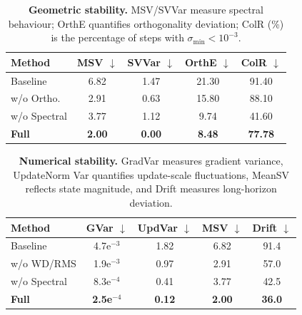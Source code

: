 \begin{table}[!t]
    \centering
    \setlength{\tabcolsep}{4.5pt}
    \caption{\textbf{Geometric stability.}
        MSV/SVVar measure spectral behaviour; OrthE quantifies orthogonality deviation;
        ColR (\%) is the percentage of steps with $\sigma_{\min}<10^{-3}$.}
    \label{tab:geo_stability}
    \begin{tabular}{
            l
            S[table-format=1.2]
            S[table-format=1.2]
            S[table-format=2.2]
            S[table-format=2.2]
        }
        \toprule
        Method & {MSV $\downarrow$} & {SVVar $\downarrow$} & {OrthE $\downarrow$} & {ColR $\downarrow$} \\
        \midrule
        Baseline      & 6.82 & 1.47 & 21.30 & 91.40 \\
        w/o Ortho.    & 2.91 & 0.63 & 15.80 & 88.10 \\
        w/o Spectral  & 3.77 & 1.12 &  9.74 & 41.60 \\
        \midrule
        \textbf{Full} & {\textbf{2.00}} & {\textbf{0.00}} & {\textbf{8.48}} & {\textbf{77.78}} \\
        \bottomrule
    \end{tabular}
\end{table}

\begin{table}[!t]
    \centering
    \setlength{\tabcolsep}{4.5pt}
    \caption{\textbf{Numerical stability.}
        GradVar measures gradient variance, UpdateNorm Var quantifies update-scale fluctuations,
        MeanSV reflects state magnitude, and Drift measures long-horizon deviation.}
    \label{tab:num_stability}
    \begin{tabular}{l*{4}{c}}
        \toprule
        Method & GVar $\downarrow$ & UpdVar $\downarrow$ & MSV $\downarrow$ & Drift $\downarrow$ \\
        \midrule
        Baseline      & 4.7e$^{-3}$ & 1.82 & 6.82 & 91.4 \\
        w/o WD/RMS    & 1.9e$^{-3}$ & 0.97 & 2.91 & 57.0 \\
        w/o Spectral  & 8.3e$^{-4}$ & 0.41 & 3.77 & 42.5 \\
        \midrule
        \textbf{Full} & \textbf{2.5e$^{-4}$} & \textbf{0.12} & \textbf{2.00} & \textbf{36.0} \\
        \bottomrule
    \end{tabular}
\end{table}
